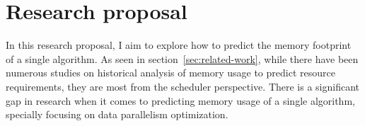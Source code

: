\section{Research proposal}
\label{sec:research-proposal}

In this research proposal, I aim to explore how to predict the memory footprint of a single algorithm.
As seen in section~\ref{sec:related-work}, while there have been numerous studies on historical analysis of memory usage to predict resource requirements, they are most from the scheduler perspective.
There is a significant gap in research when it comes to predicting memory usage of a single algorithm, specially focusing on data parallelism optimization.








